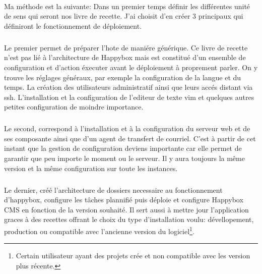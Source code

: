 \documentclass[11pt, a4paper ]{article}
\begin{document}
\begin{spacing}{1.5}
\paragraph{}
Ma méthode est la suivante: Dans un premier temps définir les différentes unité de sens qui seront nos livre de recette. J'ai choisit d'en créer 3 principaux qui définiront le fonctionnement de déploiement. 
\subparagraph{}
Le premier permet de préparer l'hote de maniére générique. Ce livre de recette n'est pas lié à l'architecture de Happybox mais est constitué d'un ensemble de configuration et d'action éxecuter avant le déploiement à proprement parler. On y trouve les réglages généraux, par exemple la configuration de la langue et du temps. La création des utilisateurs administratif ainsi que leurs accés distant via ssh. L'installation et la configuration de l'editeur de texte vim et quelques autres petites configuration de moindre importance.
\subparagraph{}
Le second, correspond à l'installation et à la configuration du serveur web et de ses composante ainsi que d'un agent de transfert de courriel. C'est à partir de cet instant que la gestion de configuration deviens importante car elle permet de garantir que peu importe le moment ou le serveur. Il y aura toujours la même version et la même configuration sur toute les instances. 
\subparagraph{}
Le dernier, créé l'architecture de dossiers necessaire au fonctionnement d'happybox, configure les tâches plannifié puis déploie et configure Happybox CMS en fonction de la version souhaité. Il sert aussi à mettre jour l'application graces à des recettes offrant le choix du type d'installation voulu: dévellopement, production ou compatible avec l'ancienne version du logiciel\footnote{Certain utilisateur ayant des projets crée et non compatible avec les version plus récente.}.

\end{spacing}
\end{document}
